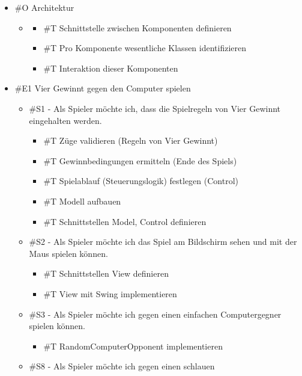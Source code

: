 \documentclass[a4paper, 10pt, fleqn]{article}
\begin{document}
\begin{itemize}
    \item \#O Architektur
    \begin{itemize}
        \item 
        \begin{itemize}
            \item \#T Schnittstelle zwischen Komponenten definieren
            \item \#T Pro Komponente wesentliche Klassen identifizieren
            \item \#T Interaktion dieser Komponenten
        \end{itemize}
    \end{itemize}
    \item \#E1 Vier Gewinnt gegen den Computer spielen
    \begin{itemize}
        \item \#S1 - Als Spieler möchte ich, dass die Spielregeln von Vier 
            Gewinnt eingehalten werden.
        \begin{itemize}
            \item \#T Züge validieren (Regeln von Vier Gewinnt)
            \item \#T Gewinnbedingungen ermitteln (Ende des Spiels)
            \item \#T Spielablauf (Steuerungslogik) festlegen (Control)
            \item \#T Modell aufbauen
            \item \#T Schnittstellen Model, Control definieren
        \end{itemize}
        \item \#S2 - Als Spieler möchte ich das Spiel am Bildschirm sehen und 
            mit der Maus spielen können.
        \begin{itemize}
            \item \#T Schnittstellen View definieren
            \item \#T View mit Swing implementieren
        \end{itemize}
        \item \#S3 - Als Spieler möchte ich gegen einen einfachen 
            Computergegner spielen können.
        \begin{itemize}
            \item \#T RandomComputerOpponent implementieren
        \end{itemize}
        \item \#S8 - Als Spieler möchte ich gegen einen schlauen 

\end{itemize}
\end{itemize}
\end{document}

